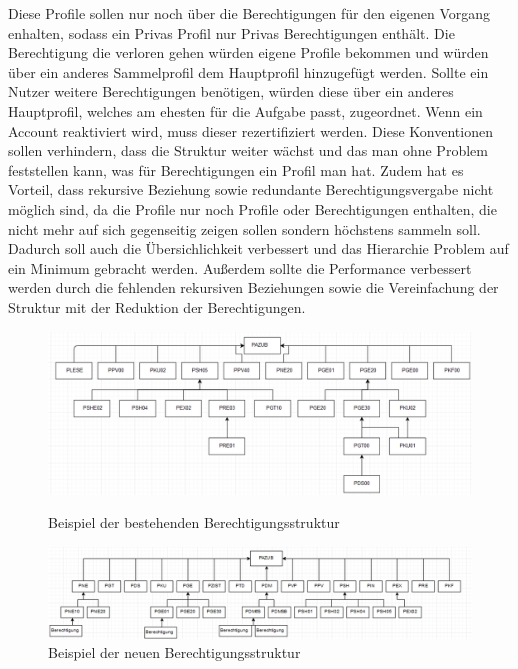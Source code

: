 Diese Profile sollen nur noch über die Berechtigungen für den eigenen Vorgang enhalten, sodass ein Privas Profil nur Privas Berechtigungen enthält.
Die Berechtigung die verloren gehen würden eigene Profile bekommen und würden über ein anderes Sammelprofil dem Hauptprofil hinzugefügt werden.
Sollte ein Nutzer weitere Berechtigungen benötigen, würden diese über ein anderes Hauptprofil, welches am ehesten für die Aufgabe passt, zugeordnet.
Wenn ein Account reaktiviert wird, muss dieser rezertifiziert werden.
\newline
Diese Konventionen sollen verhindern, dass die Struktur weiter wächst und das man ohne Problem feststellen kann, was für Berechtigungen ein Profil man hat.
Zudem hat es Vorteil, dass rekursive Beziehung sowie redundante Berechtigungsvergabe nicht möglich sind, da die Profile nur noch Profile oder Berechtigungen enthalten, die nicht mehr auf sich gegenseitig zeigen sollen sondern höchstens sammeln soll.
Dadurch soll auch die Übersichlichkeit verbessert und das Hierarchie Problem auf ein Minimum gebracht werden.
Außerdem sollte die Performance verbessert werden durch die fehlenden rekursiven Beziehungen sowie die Vereinfachung der Struktur mit der Reduktion der Berechtigungen.
\begin{figure}[h!]
\hspace*{-2cm}
 \centering
 \includegraphics[width=1.25\textwidth]{gfx/Picture/Vorher.PNG}
 \caption{Beispiel der bestehenden Berechtigungsstruktur}
 \label{fig:AltBer}
\hspace*{-2cm}
 \centering
 \includegraphics[width=1.25\textwidth]{gfx/Picture/Nachher.PNG}
 \caption{Beispiel der neuen Berechtigungsstruktur}
 \label{fig:NeuBer}
\end{figure}
